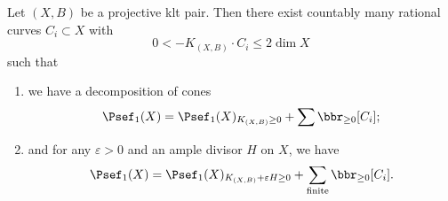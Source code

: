     \begin{theorem}\label{thm: cone theorem}
        Let \((X,B)\) be a projective klt pair.
        Then there exist countably many rational curves \(C_i \subset X\) with 
        \[ 0 < -K_{(X,B)} \cdot C_i \leq 2 \dim X \]
        such that 
        \begin{enumerate}
            \item we have a decomposition of cones
            \[ \Psef_1(X) = \Psef_1(X)_{K_{(X,B)} \geq 0} + \sum \bbr_{\geq 0}[C_i]; \]
            \item and for any \(\varepsilon > 0\) and an ample divisor \(H\) on \(X\), we have 
            \[ \Psef_1(X) = \Psef_1(X)_{K_{(X,B)}+\varepsilon H \geq 0} + \sum_{\text{finite}} \bbr_{\geq 0}[C_i]. \]
        \end{enumerate}
    \end{theorem}
